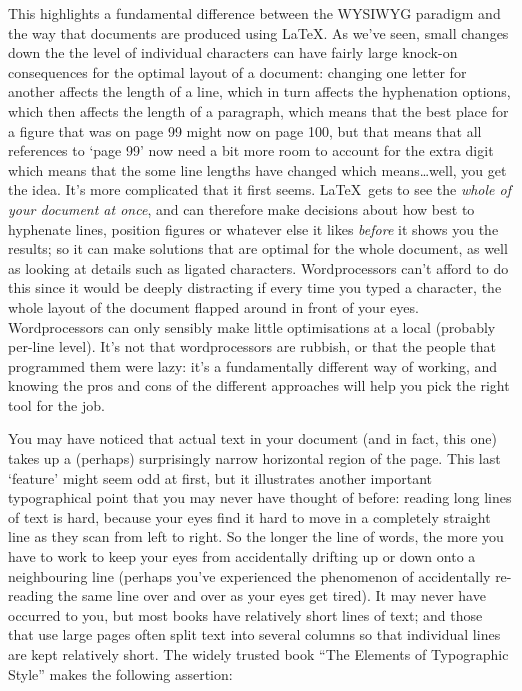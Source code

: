 \begin{refsection}
This highlights a fundamental difference between the WYSIWYG para\-digm and the way that documents are produced using \LaTeX. As we've seen, small changes down the the level of individual characters can have fairly large knock-on consequences for the optimal layout of a document: changing one letter for another affects the length of a line, which in turn affects the hyphenation options, which then affects the length of a paragraph, which means that the best place for a figure that was on page 99 might now on page 100, but that means that all references to `page 99' now need a bit more room to account for the extra digit which means that the some line lengths have changed which means\ldots well, you get the idea. It's more complicated that it first seems. \LaTeX\ gets to see the \emph{whole of your document at once}, and can therefore make decisions about how best to hyphenate lines,  position figures or whatever else it likes \emph{before} it shows you the results; so it can make solutions that are optimal for the whole document, as well as looking at details such as ligated characters. Wordprocessors can't afford to do this since it would be deeply distracting if every time you typed a character, the whole layout of the document flapped around in front of your eyes. Wordprocessors can only sensibly make little optimisations at a local (probably per-line level). It's not that wordprocessors are rubbish, or that the people that programmed them were lazy: it's a fundamentally different way of working, and knowing the pros and cons of the different approaches will help you pick the right tool for the job. 

You may have noticed that actual text in your document (and in fact, this one) takes up a (perhaps) surprisingly narrow horizontal region of the page. This last `feature' might seem odd at first, but it illustrates another important typographical point that you may never have thought of before: reading long lines of text is hard, because your eyes find it hard to move in a completely straight line as they scan from left to right. So the longer the line of words, the more you have to work to keep your eyes from accidentally drifting up or down onto a neighbouring line (perhaps you've experienced the phenomenon of accidentally re-reading the same line over and over as your eyes get tired). It may never have occurred to you, but most books have relatively short lines of text; and those that use large pages often split text into several columns so that individual lines are kept relatively short. The widely trusted book ``The Elements of Typographic Style'' \citep{bringhurst92} makes the following assertion:


\end{refsection}
